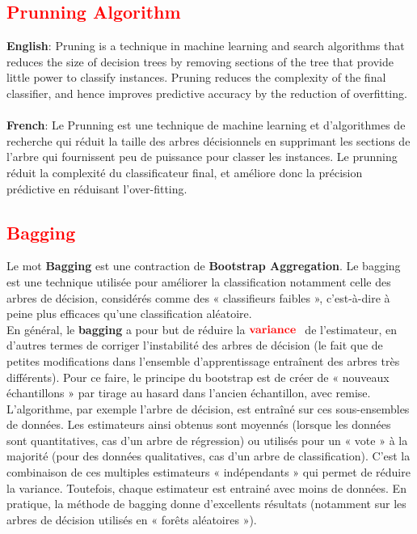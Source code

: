 \subsection{\textcolor{red}{Prunning Algorithm}}
\textbf{English}: Pruning is a technique in machine learning and search algorithms that reduces the size of decision trees by removing sections of the tree that provide little power to classify instances. Pruning reduces the complexity of the final classifier, and hence improves predictive accuracy by the reduction of overfitting.\\\\
\textbf{French}: Le Prunning est une technique de machine learning et d'algorithmes de recherche qui réduit la taille des arbres décisionnels en supprimant les sections de l'arbre qui fournissent peu de puissance pour classer les instances. Le prunning réduit la complexité du classificateur final, et améliore donc la précision prédictive en réduisant l'over-fitting.

\subsection{\textcolor{red}{Bagging}}
Le mot \textbf{Bagging} est une contraction de \textbf{Bootstrap Aggregation}. Le bagging est une technique utilisée pour améliorer la classification notamment celle des arbres de décision, considérés comme des « classifieurs faibles », c’est-à-dire à peine plus efficaces qu’une classification aléatoire.\\

En général, le \textbf{bagging} a pour but de réduire la $\textcolor{red}{\textbf{variance }}$ de l’estimateur, en d’autres termes de corriger l’instabilité des arbres de décision (le fait que de petites modifications dans l’ensemble d’apprentissage entraînent des arbres très différents). Pour ce faire,  le principe du bootstrap est de créer de « nouveaux échantillons » par tirage au hasard dans l’ancien échantillon, avec remise. L’algorithme, par exemple l’arbre de décision, est entraîné sur ces sous-ensembles de données. Les estimateurs ainsi obtenus sont moyennés (lorsque les données sont quantitatives, cas d’un arbre de régression) ou utilisés pour un « vote » à la majorité (pour des données qualitatives, cas d’un arbre de classification).  C’est la combinaison de ces multiples estimateurs « indépendants » qui permet de réduire la variance. Toutefois, chaque estimateur est entrainé avec moins de données. En pratique, la méthode de bagging donne d’excellents résultats (notamment sur les arbres de décision utilisés en « forêts aléatoires »).


